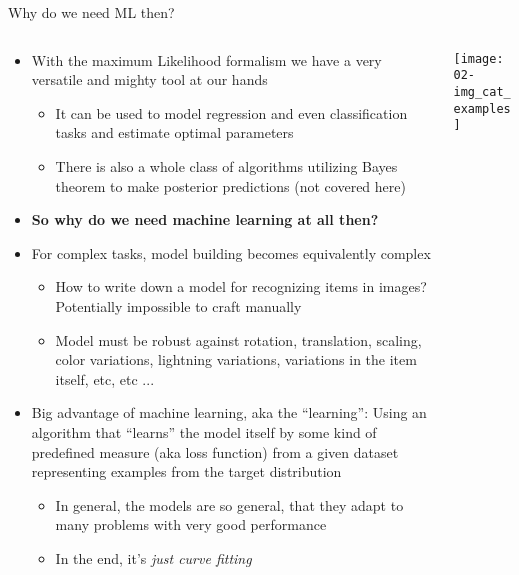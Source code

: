   \begin{frame}{Why do we need ML then?}
    \begin{columns}[c]
      \begin{column}{0.8\textwidth}
        \begin{itemize}
          \item With the maximum Likelihood formalism we have a very versatile and mighty tool at our hands
          \begin{itemize}
            \item It can be used to model regression and even classification tasks and estimate optimal parameters
            \item There is also a whole class of algorithms utilizing Bayes theorem to make posterior predictions (not covered here)
          \end{itemize}
          \item \textbf{So why do we need machine learning at all then?}
          \item For complex tasks, model building becomes equivalently complex
          \begin{itemize}
            \item How to write down a model for recognizing items in images?
              Potentially impossible to craft manually
            \item Model must be robust against rotation, translation, scaling, color variations, lightning variations, variations in the item itself, etc, etc ...
          \end{itemize}
          \item Big advantage of machine learning, aka the \enquote{learning}: Using an algorithm that \enquote{learns} the model itself by some kind of predefined measure (aka loss function) from a given dataset representing examples from the target distribution
          \begin{itemize}
            \item In general, the models are so general, that they adapt to many problems with very good performance
            \item In the end, it's \emph{just curve fitting}
          \end{itemize}
        \end{itemize}
      \end{column}
      \begin{column}{0.2\textwidth}
        \texttt{[image: 02-img\_cat\_examples]}
      \end{column}
    \end{columns}
  \end{frame}

